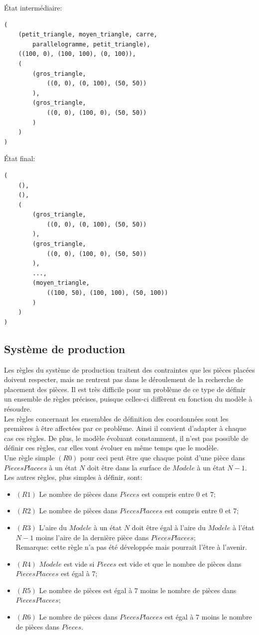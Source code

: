 \documentclass[a4paper, 11pt]{report}
\begin{document}
État intermédiaire:\\
\begin{verbatim}
(
	(petit_triangle, moyen_triangle, carre,					
		parallelogramme, petit_triangle), 
	((100, 0), (100, 100), (0, 100)),							   
	(														
		(gros_triangle, 
			((0, 0), (0, 100), (50, 50))
		),
		(gros_triangle, 
			((0, 0), (100, 0), (50, 50))
		)
	)
)
\end{verbatim}


État final:\\
\begin{verbatim}
(
	(),														
	(),														
	(													   
		(gros_triangle,
			((0, 0), (0, 100), (50, 50))
		),
		(gros_triangle, 
			((0, 0), (100, 0), (50, 50))
		),
		...,
		(moyen_triangle,
			((100, 50), (100, 100), (50, 100))
		)
	)
)
\end{verbatim}

			\subsection{Système de production}

		Les règles du système de production traitent des contraintes que les pièces placées doivent respecter, mais ne rentrent pas dans le déroulement de la recherche de placement des pièces. Il est très difficile pour un problème de ce type de définir un ensemble de règles précises, puisque celles-ci diffèrent en fonction du modèle à résoudre.\\
		Les règles concernant les ensembles de définition des coordonnées sont les premières à être affectées par ce problème. Ainsi il convient d'adapter à chaque cas ces règles. De plus, le modèle évoluant constamment, il n'est pas possible de définir ces règles, car elles vont évoluer en même temps que le modèle. \\
Une règle simple $(R0)$ pour ceci peut être que chaque point d'une pièce dans $PiecesPlacees$ à un état $N$ doit
être dans la surface de $Modele$ à un état $N-1$.\\

Les autres règles, plus simples à définir, sont:
	\begin{itemize}
		\item $(R1)$ Le nombre de pièces dans $Pieces$ est compris entre 0 et 7;
		\item $(R2)$ Le nombre de pièces dans $PiecesPlacees$ est compris entre 0 et 7;
		\item $(R3)$ L'aire du $Modele$ à un état $N$ doit être égal à l'aire du $Modele$ à l'état $N-1$ moins l'aire de la dernière pièce dans $PiecesPlacees$;\\
		Remarque: cette règle n'a pas été développée mais pourrait l'être à l'avenir.
		\item $(R4)$ $Modele$ est vide si $Pieces$ est vide et que le nombre de pièces dans $PiecesPlacees$
est égal à 7;
		\item $(R5)$ Le nombre de pièces est égal à 7 moins le nombre de pièces dans $PiecesPlacees$;
		\item $(R6)$ Le nombre de pièces dans $PiecesPlacees$ est égal à 7 moins le nombre de pièces dans $Pieces$.
	\end{itemize}
	
\end{document}
